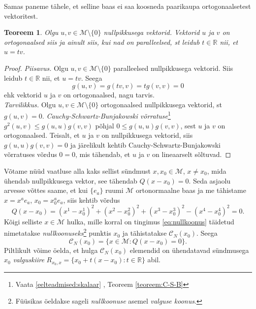 \documentclass[a4paper,12pt]{article}
\theoremstyle{plain}
\newtheorem{teoreem}{Teoreem}[section]
\theoremstyle{definition}
\numberwithin{equation}{section}
\def\R{{\mathbb R}}
\def\M{{\mathcal M}}
\begin{document}
Samas paneme tähele, et selline baas ei saa koosneda paarikaupa ortogonaalsetest vektoritest.
\begin{teoreem}
Olgu $u, v \in \M \setminus \{0\}$ nullpikkusega vektorid. Vektorid $u$ ja $v$ on ortogonaalsed siis ja ainult siis, kui nad on paralleelsed, st leidub $t \in \R$ nii, et $u = tv$.
\end{teoreem}
\begin{proof}
\emph{Piisavus.} Olgu $u, v \in \M \setminus \{0\}$ paralleelsed nullpikkusega vektorid. Siis leidub $t \in \R$ nii, et $u = tv$. Seega
\[g\left(u, v\right) = g \left(tv, v\right) = t g \left(v, v\right) = 0\]
ehk vektorid $u$ ja $v$ on ortogonaalsed, nagu tarvis.
\\
\emph{Tarvilikkus.} Olgu $u, v \in \M \setminus \{0\}$ ortogonaalsed nullpikkusega vektorid, st $g \left(u, v\right) = 0$. \emph{Cauchy-Schwartz-Bunjakowski võrratuse}\footnote{Vaata \ref{eelteadmised:skalaar} , Teoreem \ref{teoreem:C-S-B}} $g^2 \left(u, v \right) \leq g \left(u, u \right) g \left(v, v \right)$ põhjal $0 \leq g \left(u, u \right) g \left(v, v \right)$, sest $u$ ja $v$ on ortogonaalsed. Teisalt, et $u$ ja $v$ on nullpikkusega vektorid, siis $g \left(u, u \right) g \left(v, v \right) = 0$ ja järelikult kehtib Cauchy-Schwartz-Bunjakowski võrratuses võrdus $0 = 0$, mis tähendab, et $u$ ja $v$ on lineaarselt sõltuvad.
\end{proof}

Võtame nüüd vaatluse alla kaks sellist sündmust $x, x_0 \in \M$, $x \neq x_0$, mida ühendab nullpikkusega vektor, see tähendab $Q \left(x- x_0\right) = 0$. Seda asjaolu arvesse võttes saame, et kui $\{e_a\}$ ruumi $\M$ ortonormaalne baas ja me tähistame $x = x^a e_a$, $x_0 = x_0^a e_a$, siis kehtib võrdus
\begin{equation} \label{eq:nullkoonus}
Q \left(x - x_0\right) = \left(x^1 - x_0^1\right)^2 + \left(x^2 - x_0^2\right)^2 + \left(x^3 - x_0^3\right)^2 - \left(x^4 - x_0^4\right)^2 = 0.
\end{equation}
Kõigi selliste $x \in \M$ hulka, mille korral on tingimus \ref{eq:nullkoonus} täidetud nimetatakse \emph{nullkoonuseks}\footnote{Füüsikas öeldakse sageli \emph{nullkoonuse} asemel \emph{valguse koonus}.} punktis $x_0$ ja tähistatakse $\mathcal{C}_N\left(x_0\right)$. Seega 
\[\mathcal{C}_N\left(x_0\right) = \{x \in \M : Q \left(x- x_0\right) = 0 \}.\]
Piltlikult võime öelda, et hulga $\mathcal{C}_N\left(x_0\right)$ elemendid on ühendatavad sündmusega $x_0$ \emph{valguskiire} $R_{x_0, x} = \{x_0 + t\left(x - x_0\right) : t \in \R \}$ abil.
\end{document}
